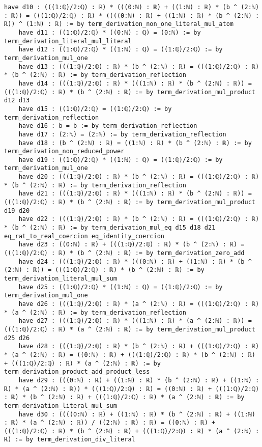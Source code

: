 \documentclass{article}
\begin{document}
\begin{tcolorbox}[colback=white!10, width=\linewidth]
\begin{lstlisting}[language=Lean4]
    have d10 : (((1:ℚ)/2:ℚ) : ℝ) * (((0:ℕ) : ℝ) + ((1:ℕ) : ℝ) * (b ^ (2:ℕ) : ℝ)) = (((1:ℚ)/2:ℚ) : ℝ) * ((((0:ℕ) : ℝ) + ((1:ℕ) : ℝ) * (b ^ (2:ℕ) : ℝ)) ^ (1:ℕ) : ℝ) := by term_derivation_non_one_literal_mul_atom
    have d11 : ((1:ℚ)/2:ℚ) * ((0:ℕ) : ℚ) = (0:ℕ) := by term_derivation_literal_mul_literal
    have d12 : ((1:ℚ)/2:ℚ) * ((1:ℕ) : ℚ) = ((1:ℚ)/2:ℚ) := by term_derivation_mul_one
    have d13 : (((1:ℚ)/2:ℚ) : ℝ) * (b ^ (2:ℕ) : ℝ) = (((1:ℚ)/2:ℚ) : ℝ) * (b ^ (2:ℕ) : ℝ) := by term_derivation_reflection
    have d14 : (((1:ℚ)/2:ℚ) : ℝ) * (((1:ℕ) : ℝ) * (b ^ (2:ℕ) : ℝ)) = (((1:ℚ)/2:ℚ) : ℝ) * (b ^ (2:ℕ) : ℝ) := by term_derivation_mul_product d12 d13
    have d15 : ((1:ℚ)/2:ℚ) = ((1:ℚ)/2:ℚ) := by term_derivation_reflection
    have d16 : b = b := by term_derivation_reflection
    have d17 : (2:ℕ) = (2:ℕ) := by term_derivation_reflection
    have d18 : (b ^ (2:ℕ) : ℝ) = ((1:ℕ) : ℝ) * (b ^ (2:ℕ) : ℝ) := by term_derivation_non_reduced_power
    have d19 : ((1:ℚ)/2:ℚ) * ((1:ℕ) : ℚ) = ((1:ℚ)/2:ℚ) := by term_derivation_mul_one
    have d20 : (((1:ℚ)/2:ℚ) : ℝ) * (b ^ (2:ℕ) : ℝ) = (((1:ℚ)/2:ℚ) : ℝ) * (b ^ (2:ℕ) : ℝ) := by term_derivation_reflection
    have d21 : (((1:ℚ)/2:ℚ) : ℝ) * (((1:ℕ) : ℝ) * (b ^ (2:ℕ) : ℝ)) = (((1:ℚ)/2:ℚ) : ℝ) * (b ^ (2:ℕ) : ℝ) := by term_derivation_mul_product d19 d20
    have d22 : (((1:ℚ)/2:ℚ) : ℝ) * (b ^ (2:ℕ) : ℝ) = (((1:ℚ)/2:ℚ) : ℝ) * (b ^ (2:ℕ) : ℝ) := by term_derivation_mul_eq d15 d18 d21 eq_rat_to_real_coercion eq_identity_coercion
    have d23 : ((0:ℕ) : ℝ) + (((1:ℚ)/2:ℚ) : ℝ) * (b ^ (2:ℕ) : ℝ) = (((1:ℚ)/2:ℚ) : ℝ) * (b ^ (2:ℕ) : ℝ) := by term_derivation_zero_add
    have d24 : (((1:ℚ)/2:ℚ) : ℝ) * (((0:ℕ) : ℝ) + ((1:ℕ) : ℝ) * (b ^ (2:ℕ) : ℝ)) = (((1:ℚ)/2:ℚ) : ℝ) * (b ^ (2:ℕ) : ℝ) := by term_derivation_literal_mul_sum
    have d25 : ((1:ℚ)/2:ℚ) * ((1:ℕ) : ℚ) = ((1:ℚ)/2:ℚ) := by term_derivation_mul_one
    have d26 : (((1:ℚ)/2:ℚ) : ℝ) * (a ^ (2:ℕ) : ℝ) = (((1:ℚ)/2:ℚ) : ℝ) * (a ^ (2:ℕ) : ℝ) := by term_derivation_reflection
    have d27 : (((1:ℚ)/2:ℚ) : ℝ) * (((1:ℕ) : ℝ) * (a ^ (2:ℕ) : ℝ)) = (((1:ℚ)/2:ℚ) : ℝ) * (a ^ (2:ℕ) : ℝ) := by term_derivation_mul_product d25 d26
    have d28 : (((1:ℚ)/2:ℚ) : ℝ) * (b ^ (2:ℕ) : ℝ) + (((1:ℚ)/2:ℚ) : ℝ) * (a ^ (2:ℕ) : ℝ) = ((0:ℕ) : ℝ) + (((1:ℚ)/2:ℚ) : ℝ) * (b ^ (2:ℕ) : ℝ) + (((1:ℚ)/2:ℚ) : ℝ) * (a ^ (2:ℕ) : ℝ) := by term_derivation_product_add_product_less
    have d29 : (((0:ℕ) : ℝ) + ((1:ℕ) : ℝ) * (b ^ (2:ℕ) : ℝ) + ((1:ℕ) : ℝ) * (a ^ (2:ℕ) : ℝ)) * (((1:ℚ)/2:ℚ) : ℝ) = ((0:ℕ) : ℝ) + (((1:ℚ)/2:ℚ) : ℝ) * (b ^ (2:ℕ) : ℝ) + (((1:ℚ)/2:ℚ) : ℝ) * (a ^ (2:ℕ) : ℝ) := by term_derivation_literal_mul_sum
    have d30 : ((((0:ℕ) : ℝ) + ((1:ℕ) : ℝ) * (b ^ (2:ℕ) : ℝ) + ((1:ℕ) : ℝ) * (a ^ (2:ℕ) : ℝ)) / ((2:ℕ) : ℝ) : ℝ) = ((0:ℕ) : ℝ) + (((1:ℚ)/2:ℚ) : ℝ) * (b ^ (2:ℕ) : ℝ) + (((1:ℚ)/2:ℚ) : ℝ) * (a ^ (2:ℕ) : ℝ) := by term_derivation_div_literal

\end{lstlisting}
\end{tcolorbox}
\end{document}
